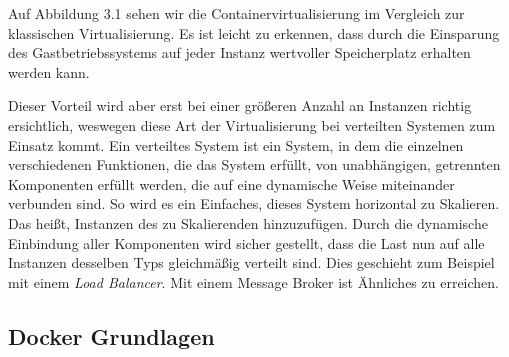 \documentclass[12pt,a4paper]{scrartcl}
\begin{document}
Auf Abbildung 3.1 sehen wir die Containervirtualisierung im Vergleich zur klassischen Virtualisierung. Es ist leicht zu erkennen, dass durch die Einsparung des Gastbetriebssystems auf jeder Instanz wertvoller Speicherplatz erhalten werden kann. 

Dieser Vorteil wird aber erst bei einer größeren Anzahl an Instanzen richtig ersichtlich, weswegen diese Art der Virtualisierung bei verteilten Systemen zum Einsatz kommt. Ein verteiltes System ist ein System, in dem die einzelnen verschiedenen Funktionen, die das System erfüllt, von unabhängigen, getrennten Komponenten erfüllt werden, die auf eine dynamische Weise miteinander verbunden sind. So wird es ein Einfaches, dieses System horizontal zu Skalieren. Das heißt, Instanzen des zu Skalierenden hinzuzufügen. Durch die dynamische Einbindung aller Komponenten wird sicher gestellt, dass die Last nun auf alle Instanzen desselben Typs gleichmäßig verteilt sind. Dies geschieht zum Beispiel mit einem \emph{Load Balancer}. Mit einem Message Broker ist Ähnliches zu erreichen.

\subsection{Docker Grundlagen}
\end{document}
